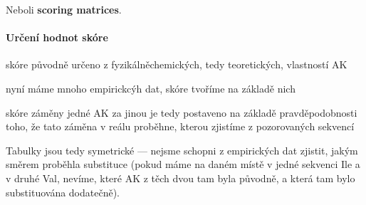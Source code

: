 \documentclass[DIV=8]{scrreprt}
\begin{document}
Neboli \textbf{scoring matrices}.

\paragraph{Určení hodnot skóre}
\begin{myItemize}[nosep]
    \item skóre původně určeno z fyzikálněchemických, tedy teoretických, vlastností AK
    \item nyní máme mnoho empirickcýh dat, skóre tvoříme na základě nich
\begin{myItemize}[nosep]
    \item skóre záměny jedné AK za jinou je tedy postaveno na základě pravděpodobnosti toho, že tato záměna v reálu proběhne, kterou zjistíme z pozorovaných sekvencí
\end{myItemize}

\end{myItemize}



Tabulky jsou tedy symetrické --- nejsme schopni z empirických dat zjistit, jakým směrem proběhla substituce (pokud máme na daném místě v jedné sekvenci Ile a v druhé Val, nevíme, které AK z těch dvou tam byla původně, a která tam bylo substituována dodatečně).
\end{document}
